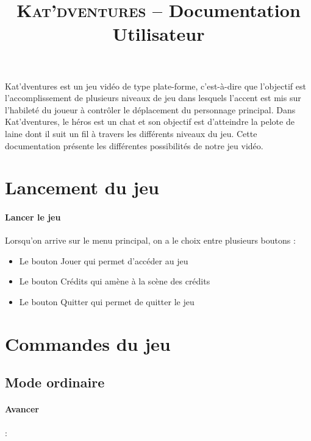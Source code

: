 \documentclass[a4paper,11pt]{article}
\title{ \textsc{Kat'dventures} -- Documentation Utilisateur}
\date{}                    %
\begin{document}
          

\maketitle                 %
\thispagestyle{empty}      %


Kat’dventures est un jeu vidéo de type plate-forme, c’est-à-dire que l’objectif est l’accomplissement de plusieurs niveaux de jeu dans lesquels l'accent est mis sur l'habileté du joueur à contrôler le déplacement du personnage principal. Dans Kat’dventures, le héros est un chat et son objectif est d’atteindre la pelote de laine dont il suit un fil à travers les différents niveaux du jeu.
Cette documentation présente les différentes possibilités de notre jeu vidéo.

\section{Lancement du jeu}
\paragraph{Lancer le jeu}   Lorsqu'on arrive sur le menu principal, on a le choix entre plusieurs boutons :

\begin{itemize}
\item Le bouton Jouer qui permet d'accéder au jeu
\item Le bouton Crédits qui amène à la scène des crédits
\item Le bouton Quitter qui permet de quitter le jeu
\end{itemize}

\section{Commandes du jeu}
\subsection{Mode ordinaire}
\paragraph{Avancer }: \fbox{$\rightarrow$}
\end{document}
